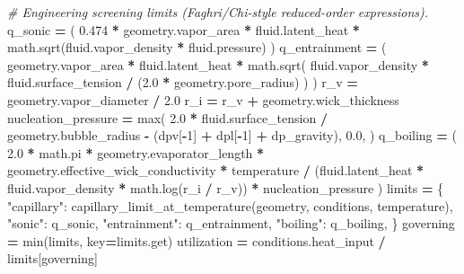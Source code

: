 \documentclass[
  12pt,a4paper,oneside]{report}
\newenvironment{Shaded}{\begin{snugshade}}{\end{snugshade}}
\newcommand{\BuiltInTok}[1]{#1}
\newcommand{\CommentTok}[1]{\textcolor[rgb]{0.56,0.35,0.01}{\textit{#1}}}
\newcommand{\DecValTok}[1]{\textcolor[rgb]{0.00,0.00,0.81}{#1}}
\newcommand{\FloatTok}[1]{\textcolor[rgb]{0.00,0.00,0.81}{#1}}
\newcommand{\NormalTok}[1]{#1}
\newcommand{\OperatorTok}[1]{\textcolor[rgb]{0.81,0.36,0.00}{\textbf{#1}}}
\newcommand{\StringTok}[1]{\textcolor[rgb]{0.31,0.60,0.02}{#1}}
\begin{document}
\begin{Shaded}
\begin{Highlighting}[]
    \CommentTok{\# Engineering screening limits (Faghri/Chi{-}style reduced{-}order expressions).}
\NormalTok{    q\_sonic }\OperatorTok{=}\NormalTok{ (}
        \FloatTok{0.474} \OperatorTok{*}\NormalTok{ geometry.vapor\_area }\OperatorTok{*}\NormalTok{ fluid.latent\_heat}
        \OperatorTok{*}\NormalTok{ math.sqrt(fluid.vapor\_density }\OperatorTok{*}\NormalTok{ fluid.pressure)}
\NormalTok{    )}
\NormalTok{    q\_entrainment }\OperatorTok{=}\NormalTok{ (}
\NormalTok{        geometry.vapor\_area }\OperatorTok{*}\NormalTok{ fluid.latent\_heat}
        \OperatorTok{*}\NormalTok{ math.sqrt(}
\NormalTok{            fluid.vapor\_density }\OperatorTok{*}\NormalTok{ fluid.surface\_tension}
            \OperatorTok{/}\NormalTok{ (}\FloatTok{2.0} \OperatorTok{*}\NormalTok{ geometry.pore\_radius)}
\NormalTok{        )}
\NormalTok{    )}
\NormalTok{    r\_v }\OperatorTok{=}\NormalTok{ geometry.vapor\_diameter }\OperatorTok{/} \FloatTok{2.0}
\NormalTok{    r\_i }\OperatorTok{=}\NormalTok{ r\_v }\OperatorTok{+}\NormalTok{ geometry.wick\_thickness}
\NormalTok{    nucleation\_pressure }\OperatorTok{=} \BuiltInTok{max}\NormalTok{(}
        \FloatTok{2.0} \OperatorTok{*}\NormalTok{ fluid.surface\_tension }\OperatorTok{/}\NormalTok{ geometry.bubble\_radius}
        \OperatorTok{{-}}\NormalTok{ (dpv[}\OperatorTok{{-}}\DecValTok{1}\NormalTok{] }\OperatorTok{+}\NormalTok{ dpl[}\OperatorTok{{-}}\DecValTok{1}\NormalTok{] }\OperatorTok{+}\NormalTok{ dp\_gravity),}
        \FloatTok{0.0}\NormalTok{,}
\NormalTok{    )}
\NormalTok{    q\_boiling }\OperatorTok{=}\NormalTok{ (}
        \FloatTok{2.0} \OperatorTok{*}\NormalTok{ math.pi }\OperatorTok{*}\NormalTok{ geometry.evaporator\_length}
        \OperatorTok{*}\NormalTok{ geometry.effective\_wick\_conductivity }\OperatorTok{*}\NormalTok{ temperature}
        \OperatorTok{/}\NormalTok{ (fluid.latent\_heat }\OperatorTok{*}\NormalTok{ fluid.vapor\_density }\OperatorTok{*}\NormalTok{ math.log(r\_i }\OperatorTok{/}\NormalTok{ r\_v))}
        \OperatorTok{*}\NormalTok{ nucleation\_pressure}
\NormalTok{    )}
\NormalTok{    limits }\OperatorTok{=}\NormalTok{ \{}
        \StringTok{"capillary"}\NormalTok{: capillary\_limit\_at\_temperature(geometry, conditions, temperature),}
        \StringTok{"sonic"}\NormalTok{: q\_sonic,}
        \StringTok{"entrainment"}\NormalTok{: q\_entrainment,}
        \StringTok{"boiling"}\NormalTok{: q\_boiling,}
\NormalTok{    \}}
\NormalTok{    governing }\OperatorTok{=} \BuiltInTok{min}\NormalTok{(limits, key}\OperatorTok{=}\NormalTok{limits.get)}
\NormalTok{    utilization }\OperatorTok{=}\NormalTok{ conditions.heat\_input }\OperatorTok{/}\NormalTok{ limits[governing]}

\end{Highlighting}
\end{Shaded}
\end{document}
